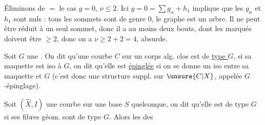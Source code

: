 Éliminons de $=$ le cas $g=0$, $\nu\leq2$. Ici $g=0=\sum g_\alpha+h_1$ implique que les $g_\alpha$ et $h_1$ sont nuls : tous les sommets sont de genre $0$, le graphe est un arbre. Il ne peut être réduit à un seul sommet, donc il a au moins deux bouts, dont les  marqués doivent être $\geq2$, donc  on a $\nu\geq2+2=4$, absurde.

Soit $G$ une . On dit qu'une  courbe  $C$ sur un corps alg. clos est de \uline{type $G$}, si sa maquette est iso à $G$, on dit qu'elle est \uline{épinglée} si on se donne un iso entre sa maquette et $G$ (c'est donc une structure suppl. sur $\unsure{C|X}$, appelée $G$-épinglage).

Soit $(\widehat X,I)$ une courbe  sur une base $S$ quelconque, on dit qu'elle est de type $G$ si ses fibres géom. sont de type $G$. Alors les  des
